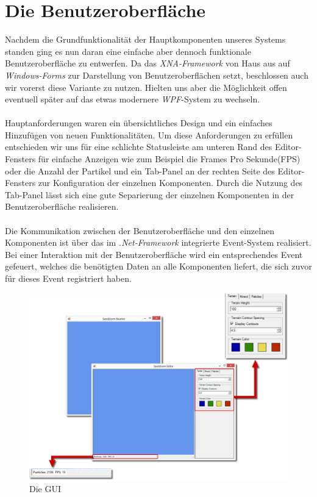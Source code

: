 \section{Die Benutzeroberfläche}
\begin{Spacing}{\mylinespace}

Nachdem die Grundfunktionalität der Hauptkomponenten unseres Systems standen ging es nun daran eine einfache aber dennoch funktionale Benutzeroberfläche zu entwerfen. Da das \textit{XNA-Framework} von Haus aus auf \textit{Windows-Forms} zur Darstellung von Benutzeroberflächen setzt, beschlossen auch wir vorerst diese Variante zu nutzen. Hielten uns aber die Möglichkeit offen eventuell später auf das etwas modernere \textit{WPF}-System zu wechseln.
\\\\
Hauptanforderungen waren ein übersichtliches Design und ein einfaches Hinzufügen von neuen Funktionalitäten. Um diese Anforderungen zu erfüllen entschieden wir uns für eine schlichte Statusleiste am unteren Rand des Editor-Fensters für einfache Anzeigen wie zum Beispiel die Frames Pro Sekunde(FPS) oder die Anzahl der Partikel und ein Tab-Panel an der rechten Seite des Editor-Fensters zur Konfiguration der einzelnen Komponenten. Durch die Nutzung des Tab-Panel lässt sich eine gute Separierung der einzelnen Komponenten in der Benutzeroberfläche realisieren. 
\\\\
Die Kommunikation zwischen der Benutzeroberfläche und den einzelnen Komponenten ist über das im \textit{.Net-Framework} integrierte Event-System realisiert. Bei einer Interaktion mit der Benutzeroberfläche wird ein entsprechendes Event gefeuert, welches die benötigten Daten an alle Komponenten liefert, die sich zuvor für dieses Event registriert haben.  

\begin{figure}[h!]
	\vspace*{30px}
	\includegraphics[width=\columnwidth]{graphics/gui.png}	
	\caption{Die GUI}
	\label{fig:GUI}
\end{figure}

\end{Spacing}
\newpage
\clearpage
